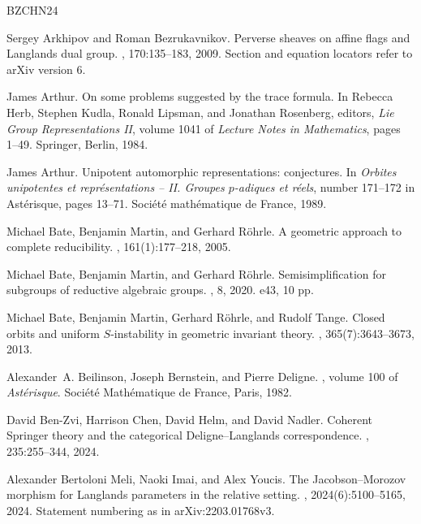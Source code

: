 \documentclass[11pt]{article}
\numberwithin{equation}{section}
\theoremstyle{definition}
\theoremstyle{remark}
\begin{document}
\begin{thebibliography}{BZCHN24}

Sergey Arkhipov and Roman Bezrukavnikov.
\newblock Perverse sheaves on affine flags and {Langlands} dual group.
, 170:135--183, 2009.
\newblock Section and equation locators refer to arXiv version 6.

James Arthur.
\newblock On some problems suggested by the trace formula.
\newblock In Rebecca Herb, Stephen Kudla, Ronald Lipsman, and Jonathan
  Rosenberg, editors, {\em Lie Group Representations II}, volume 1041 of {\em
  Lecture Notes in Mathematics}, pages 1--49. Springer, Berlin, 1984.

James Arthur.
\newblock Unipotent automorphic representations: conjectures.
\newblock In {\em Orbites unipotentes et repr\'esentations -- II. Groupes
  $p$-adiques et r\'eels}, number 171--172 in Ast\'erisque, pages 13--71.
  Soci\'et\'e math\'ematique de France, 1989.

Michael Bate, Benjamin Martin, and Gerhard R{\"o}hrle.
\newblock A geometric approach to complete reducibility.
, 161(1):177--218, 2005.

Michael Bate, Benjamin Martin, and Gerhard R{\"o}hrle.
\newblock Semisimplification for subgroups of reductive algebraic groups.
, 8, 2020.
\newblock e43, 10 pp.

Michael Bate, Benjamin Martin, Gerhard R{\"o}hrle, and Rudolf Tange.
\newblock Closed orbits and uniform {$S$}-instability in geometric invariant
  theory.
,
  365(7):3643--3673, 2013.

Alexander~A. Beilinson, Joseph Bernstein, and Pierre Deligne.
, volume 100 of {\em Ast{\'e}risque}.
\newblock Soci{\'e}t{\'e} Math{\'e}matique de France, Paris, 1982.

David Ben-Zvi, Harrison Chen, David Helm, and David Nadler.
\newblock Coherent {Springer} theory and the categorical {Deligne--Langlands}
  correspondence.
, 235:255--344, 2024.

Alexander {Bertoloni Meli}, Naoki Imai, and Alex Youcis.
\newblock The {Jacobson--Morozov} morphism for {Langlands} parameters in the
  relative setting.
, 2024(6):5100--5165,
  2024.
\newblock Statement numbering as in arXiv:2203.01768v3.


\end{thebibliography}
\end{document}
